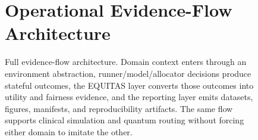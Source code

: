 \documentclass[conference]{IEEEtran}
\begin{document}
\begin{figure}[!htbp]
\section{Operational Evidence-Flow Architecture}
\label{app:evidence_flow_architecture}
\centering
\resizebox{1.0\textwidth}{!}{}
\caption{Full evidence-flow architecture. Domain context enters through an
environment abstraction, runner/model/allocator decisions produce stateful
outcomes, the EQUITAS layer converts those outcomes into utility and fairness
evidence, and the reporting layer emits datasets, figures, manifests, and
reproducibility artifacts. The same flow supports clinical simulation and
quantum routing without forcing either domain to imitate the other.}
\label{fig:appendix_architecture}
\end{figure}
\end{document}
